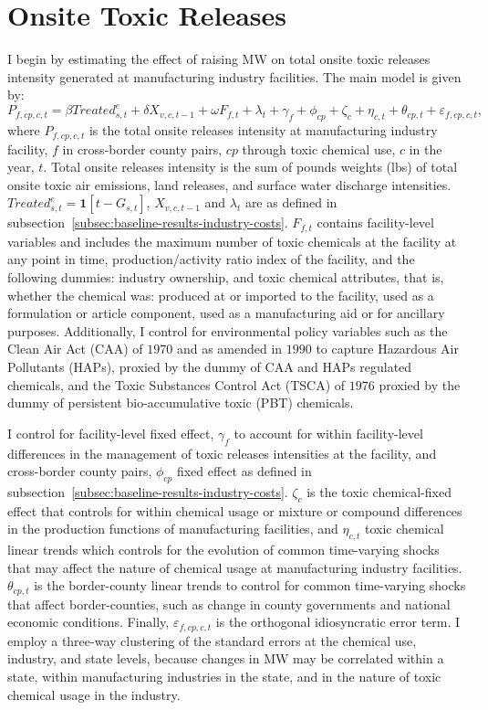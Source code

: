 \documentclass[authoryear, preprint, twocolumn, 1p]{elsarticle}
\begin{document}
    \section{Onsite Toxic Releases}\label{sec:onsite-toxic-releases}
    I begin by estimating the effect of raising MW on total onsite toxic releases intensity generated at manufacturing industry facilities. The main model is given by:
    \begin{equation}
        P_{f,cp,c,t} = \beta Treated_{s,t}^e + \delta X_{v,c,t-1} + \omega F_{f,t} + \lambda_{t} + \gamma_{f} + \phi_{cp} + \zeta_{c} + \eta_{c,t} + \theta_{cp,t} + \varepsilon_{f,cp,c,t},\label{eq:baseline-total-onsite-releases-intensity}
    \end{equation}
    where $P_{f,cp,c,t}$ is the total onsite releases intensity at manufacturing industry facility, $f$ in cross-border county pairs, $cp$ through toxic chemical use, $c$ in the year, $t$. Total onsite releases intensity is the sum of pounds weights (lbs) of total onsite toxic air emissions, land releases, and surface water discharge intensities. $Treated_{s,t}^e = \textbf{1}[t - G_{s,t}]$, $X_{v,c,t-1}$ and $\lambda_{t}$ are as defined in subsection~\ref{subsec:baseline-results-industry-costs}. $F_{f,t}$ contains facility-level variables and includes the maximum number of toxic chemicals at the facility at any point in time, production/activity ratio index of the facility, and the following dummies: industry ownership, and toxic chemical attributes, that is, whether the chemical was: produced at or imported to the facility, used as a formulation or article component, used as a manufacturing aid or for ancillary purposes. Additionally, I control for environmental policy variables such as the Clean Air Act (CAA) of $1970$ and as amended in $1990$ to capture Hazardous Air Pollutants (HAPs), proxied by the dummy of CAA and HAPs regulated chemicals, and the Toxic Substances Control Act (TSCA) of $1976$ proxied by the dummy of persistent bio-accumulative toxic (PBT) chemicals.

    I control for facility-level fixed effect, $\gamma_{f}$ to account for within facility-level differences in the management of toxic releases intensities at the facility, and cross-border county pairs, $\phi_{cp}$ fixed effect as defined in subsection~\ref{subsec:baseline-results-industry-costs}. $\zeta_{c}$ is the toxic chemical-fixed effect that controls for within chemical usage or mixture or compound differences in the production functions of manufacturing facilities, and $\eta_{c,t}$ toxic chemical linear trends which controls for the evolution of common time-varying shocks that may affect the nature of chemical usage at manufacturing industry facilities. $\theta_{cp,t}$ is the border-county linear trends to control for common time-varying shocks that affect border-counties, such as change in county governments and national economic conditions. Finally, $\varepsilon_{f,cp,c,t}$ is the orthogonal idiosyncratic error term. I employ a three-way clustering of the standard errors at the chemical use, industry, and state levels, because changes in MW may be correlated within a state, within manufacturing industries in the state, and in the nature of toxic chemical usage in the industry.
    
\end{document}
